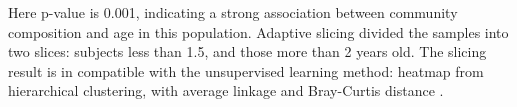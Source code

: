 \documentclass[a4paper,11pt]{article}
\begin{document}
Here p-value is 0.001, indicating a strong association between community composition and age in this population. Adaptive slicing divided the samples into two slices: subjects less than 1.5, and those more than 2 years old. The slicing result is in compatible with the unsupervised learning method: heatmap from hierarchical clustering, with average linkage and Bray-Curtis distance \citep{song2019an}.




\end{document}
